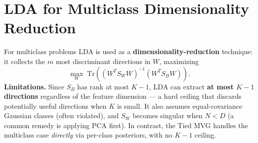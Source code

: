 \bigskip
\section*{LDA for Multiclass Dimensionality Reduction}

For multiclass problems LDA is used as a \textbf{dimensionality-reduction} technique: it collects the $m$ most discriminant directions in $W$, maximizing
\[
\max_W \; \mathrm{Tr}\!\left((W^T S_W W)^{-1}(W^T S_B W)\right).
\]
\textbf{Limitations.} Since $S_B$ has rank at most $K-1$, LDA can extract \textbf{at most $K-1$ directions} regardless of the feature dimension --- a hard ceiling that discards potentially useful directions when $K$ is small. It also assumes equal-covariance Gaussian classes (often violated), and $S_W$ becomes singular when $N<D$ (a common remedy is applying PCA first). In contrast, the Tied MVG handles the multiclass case \emph{directly} via per-class posteriors, with no $K-1$ ceiling.
